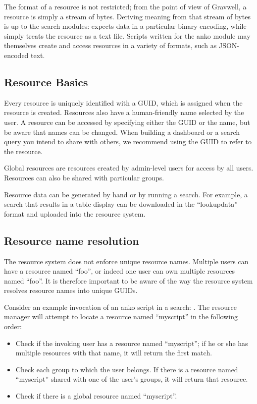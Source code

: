 The format of a resource is not restricted; from the point of view of
Gravwell, a resource is simply a stream of bytes. Deriving meaning from
that stream of bytes is up to the search modules:  expects data in
a particular binary encoding, while  simply treats the resource as a
text file. Scripts written for the anko module may themselves create and
access resources in a variety of formats, such as JSON-encoded text.

\subsection{Resource Basics}

Every resource is uniquely identified with a GUID, which is assigned
when the resource is created. Resources also have a human-friendly name
selected by the user. A resource can be accessed by specifying either
the GUID or the name, but be aware that names can be changed. When
building a dashboard or a search query you intend to share with others,
we recommend using the GUID to refer to the resource.

Global resources are resources created by admin-level users for access
by all users. Resources can also be shared with particular groups.

Resource data can be generated by hand or by running a search. For
example, a search that results in a table display can be downloaded in
the ``lookupdata'' format and uploaded into the resource system.

\subsection{Resource name resolution}

The resource system does not enforce unique resource names. Multiple
users can have a resource named ``foo'', or indeed one user can own
multiple resources named ``foo''. It is therefore important to be aware of
the way the resource system resolves resource names into unique GUIDs.

Consider an example invocation of an anko script in a search: . The resource manager will attempt to locate a resource named
``myscript'' in the following order:

\begin{itemize}
\item
  Check if the invoking user has a resource named ``myscript''; if he
  or she has multiple resources with that name, it will return the first
  match.
\item
  Check each group to which the user belongs. If there is a resource
  named ``myscript'' shared with one of the user's groups, it will
  return that resource.
\item
  Check if there is a global resource named ``myscript''.
\end{itemize}

